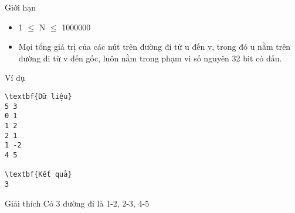 Giới hạn  
\begin{itemize}
	\item     1  $\le$  N  $\le$  1000000   
	\item     Mọi tổng giá trị của các nút trên đường đi từ u đến v, trong đó u nằm trên đường đi từ v đến gốc, luôn nằm trong phạm vi số nguyên 32 bit có dấu.   
\end{itemize}
   Ví dụ  
\begin{verbatim}
\textbf{Dữ liệu}
5 3
0 1
1 2
2 1
1 -2
4 5

\textbf{Kết quả}
3
\end{verbatim}
   Giải thích  
Có 3 đường đi là 1-2, 2-3, 4-5